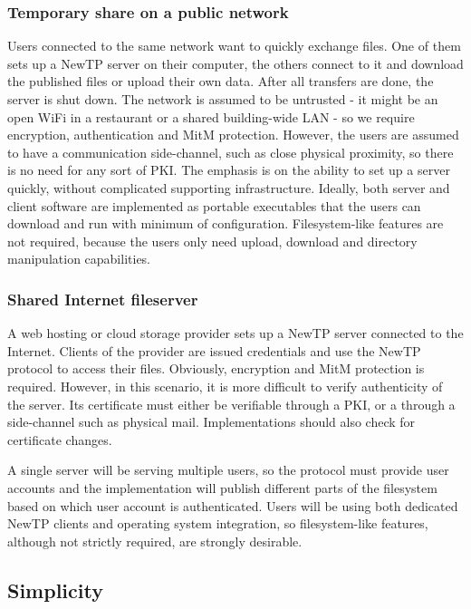 \subsubsection{Temporary share on a public network}

Users connected to the same network want to quickly exchange files. One of them sets up a NewTP server on
their computer, the others connect to it and download the published files or upload their own data. After all
transfers are done, the server is shut down. The network is assumed to be untrusted - it might be an open WiFi
in a restaurant or a shared building-wide LAN - so we require encryption, authentication and MitM protection.
However, the users are assumed to have a communication side-channel, such as close physical proximity, so
there is no need for any sort of PKI. The emphasis is on the ability to set up a server quickly, without
complicated supporting infrastructure. Ideally, both server and client software are implemented as portable
executables that the users can download and run with minimum of configuration. Filesystem-like features are
not required, because the users only need upload, download and directory manipulation capabilities.

\subsubsection{Shared Internet fileserver}

A web hosting or cloud storage provider sets up a NewTP server connected to the Internet. Clients of the
provider are issued credentials and use the NewTP protocol to access their files. Obviously, encryption and
MitM protection is required. However, in this scenario, it is more difficult to verify authenticity of the
server. Its certificate must either be verifiable through a PKI, or a through a side-channel such as physical
mail.  Implementations should also check for certificate changes.

A single server will be serving multiple users, so the protocol must provide user accounts and the
implementation will publish different parts of the filesystem based on which user account is authenticated.
Users will be using both dedicated NewTP clients and operating system integration, so filesystem-like
features, although not strictly required, are strongly desirable.


\subsection{Simplicity}

